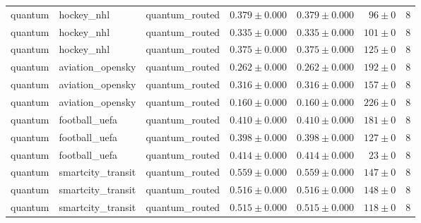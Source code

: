 \begin{table}[htbp]
\begin{tabular}{l l l r r r r}
quantum & hockey\_nhl & quantum\_routed & $0.379\pm0.000$ & $0.379\pm0.000$ & $96\pm0$ & 8 \\
quantum & hockey\_nhl & quantum\_routed & $0.335\pm0.000$ & $0.335\pm0.000$ & $101\pm0$ & 8 \\
quantum & hockey\_nhl & quantum\_routed & $0.375\pm0.000$ & $0.375\pm0.000$ & $125\pm0$ & 8 \\
quantum & aviation\_opensky & quantum\_routed & $0.262\pm0.000$ & $0.262\pm0.000$ & $192\pm0$ & 8 \\
quantum & aviation\_opensky & quantum\_routed & $0.316\pm0.000$ & $0.316\pm0.000$ & $157\pm0$ & 8 \\
quantum & aviation\_opensky & quantum\_routed & $0.160\pm0.000$ & $0.160\pm0.000$ & $226\pm0$ & 8 \\
quantum & football\_uefa & quantum\_routed & $0.410\pm0.000$ & $0.410\pm0.000$ & $181\pm0$ & 8 \\
quantum & football\_uefa & quantum\_routed & $0.398\pm0.000$ & $0.398\pm0.000$ & $127\pm0$ & 8 \\
quantum & football\_uefa & quantum\_routed & $0.414\pm0.000$ & $0.414\pm0.000$ & $23\pm0$ & 8 \\
quantum & smartcity\_transit & quantum\_routed & $0.559\pm0.000$ & $0.559\pm0.000$ & $147\pm0$ & 8 \\
quantum & smartcity\_transit & quantum\_routed & $0.516\pm0.000$ & $0.516\pm0.000$ & $148\pm0$ & 8 \\
quantum & smartcity\_transit & quantum\_routed & $0.515\pm0.000$ & $0.515\pm0.000$ & $118\pm0$ & 8 \\
\hline
\end{tabular}
\end{table}
